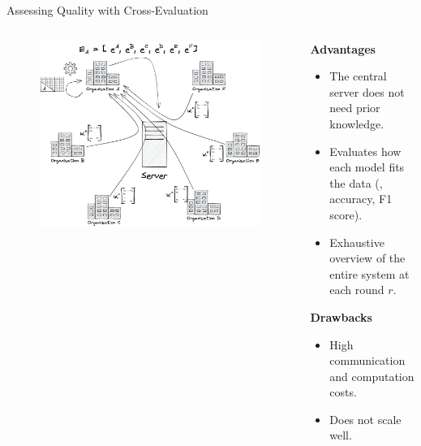 \begin{frame}{Assessing Quality with Cross-Evaluation}

  \begin{columns}
    \begin{column}{.45\textwidth}
      \begin{figure}
        \centering
        \includegraphics[width=\textwidth]{figures/radar/xeval}
      \end{figure}
    \end{column}
    
    \begin{column}{.55\textwidth}
      \small
      \setlength{\baselineskip}{0.8\baselineskip}
      \vspace{1ex}

      \textbf{Advantages}
      \begin{itemize}
        \item The central server does not need prior knowledge.
        \item Evaluates how each model fits the data (\eg, accuracy, F1 score).
        \item Exhaustive overview of the entire system at each round $r$.
      \end{itemize}

      \pause
      \textbf{Drawbacks}
      \begin{itemize}
        \item High communication and computation costs.
        \item Does not scale well.
      \end{itemize}



\end{column}
\end{columns}
\end{frame}
